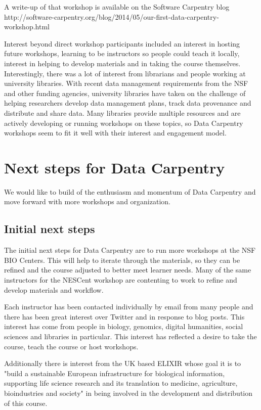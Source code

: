 \documentclass[11pt]{article}
\begin{document}
A write-up of that workshop is available on the Software Carpentry blog
\\http://software-carpentry.org/blog/2014/05/our-first-data-carpentry-workshop.html

Interest beyond direct workshop participants included an interest in hosting future workshops, learning to be 
instructors so people could teach it locally, interest in helping to develop materials and in taking the course themselves.
Interestingly, there was a lot of interest from librarians and people working at university libraries. With recent data management requirements from the NSF and other funding agencies, university libraries have
taken on the challenge of helping researchers develop data management plans, track data provenance and 
distribute and share data. Many libraries provide multiple resources and are actively developing or running workshops
on these topics, so Data Carpentry workshops seem to fit it well with their interest and engagement model.


\section{Next steps for Data Carpentry}

We would like to build of the enthusiasm and momentum of Data Carpentry and move forward with more workshops 
and organization.

\subsection{Initial next steps}

The initial next steps for Data Carpentry are to run more workshops at the NSF BIO Centers. This will help to 
iterate through the materials, so they can be refined and the course adjusted to better meet learner needs. Many of the same instructors for the NESCent workshop are contenting to work to refine and develop materials and workflow.

Each instructor has been contacted individually by email from many people and there has been great interest over Twitter and in response to blog posts. 
This interest has come from people 
in biology, genomics, digital humanities, social sciences and libraries in particular.
This interest has reflected a desire to take the course, teach the course or host
workshops. 

Additionally there is interest from the UK based ELIXIR whose goal it is to "build a sustainable European infrastructure for biological information, supporting life science research and its translation to medicine, agriculture, bioindustries and society" in being involved in the development and distribution of this course. 
\end{document}
